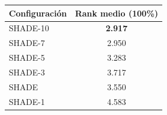 \begin{tabular}{lc}
\toprule
\textbf{Configuración} & \textbf{Rank medio (100\%)} \\
\midrule
SHADE-10 & \textbf{2.917} \\
SHADE-7 & 2.950 \\
SHADE-5 & 3.283 \\
SHADE-3 & 3.717 \\
SHADE & 3.550 \\
SHADE-1 & 4.583 \\
\bottomrule
\end{tabular}
